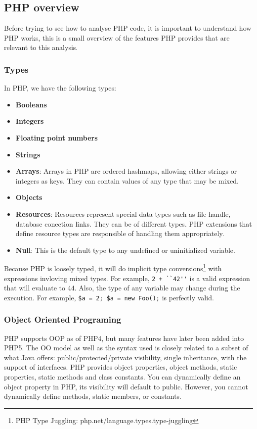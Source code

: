 \documentclass[a4paper]{article}
\begin{document}

\subsection{PHP overview}
Before trying to see how to analyse PHP code, it is important to understand how PHP works,
this is a small overview of the features PHP provides that are relevant to this analysis.
\subsubsection{Types}
In PHP, we have the following types:
\begin{itemize}
  \item \textbf{Booleans}
  \item \textbf{Integers}
  \item \textbf{Floating point numbers}
  \item \textbf{Strings}
  \item \textbf{Arrays}: Arrays in PHP are ordered hashmaps, allowing either strings or
    integers as keys.  They can contain values of any type that may be mixed.
  \item \textbf{Objects}
  \item \textbf{Resources}: Resources represent special data types such as
    file handle, database conection links. They can be of different types. PHP
    extensions that define resource types are responsible of handling them
    appropriately.
  \item \textbf{Null}: This is the default type to any undefined or
    uninitialized variable.
\end{itemize}

Because PHP is loosely typed, it will do implicit type conversions\footnote{PHP
Type Juggling: php.net/language.types.type-juggling} with expressions invloving
mixed types. For example, \verb&2 + ``42''& is a valid expression that will
evaluate to $44$. Also, the type of any variable may change during the
execution.  For example, \verb&$a = 2; $a = new Foo();& is perfectly valid.

\subsubsection{Object Oriented Programing}
PHP supports OOP as of PHP4, but many features have later been added into PHP5.
The OO model as well as the syntax used is closely related to a subset of what
Java offers: public/protected/private visibility, single inheritance, with the
support of interfaces. PHP provides object properties, object methods, static
properties, static methods and class constants. You can dynamically define an
object property in PHP, its visibility will default to public. However, you
cannot dynamically define methods, static members, or constants.
\end{document}
